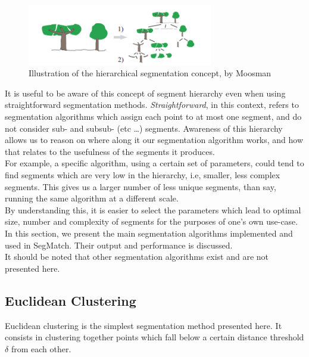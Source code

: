 \begin{figure}
  \centering
  \includegraphics[width=3.2in]{images/hierarchical.png}
  \caption{Illustration of the hierarchical segmentation concept, by Moosman \cite{moosmann2011unsupervised}}
  \label{fig:hierarchical}
\end{figure}

It is useful to be aware of this concept of segment hierarchy even when using straightforward segmentation methods. \textit{Straightforward}, in this context, refers to segmentation algorithms which assign each point to at most one segment, and do not consider sub- and subsub- (etc \ldots) segments. Awareness of this hierarchy allows us to reason on where along it our segmentation algorithm works, and how that relates to the usefulness of the segments it produces.\\

For example, a specific algorithm, using a certain set of parameters, could tend to find segments which are very low in the hierarchy, i.e, smaller, less complex segments. This gives us a larger number of less unique segments, than say, running the same algorithm at a different scale.\\

By understanding this, it is easier to select the parameters which lead to optimal size, number and complexity of segments for the purposes of one's own use-case.\\

In this section, we present the main segmentation algorithms implemented and used in SegMatch. Their output and performance is discussed.\\

It should be noted that other segmentation algorithms exist and are not presented here.\\

\subsection{Euclidean Clustering}
\label{subsec:euclidean}

Euclidean clustering is the simplest segmentation method presented here. It consists in clustering together points which fall below a certain distance threshold $\delta$ from each other.\\


